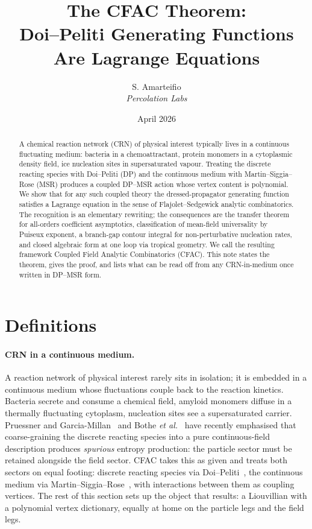 \documentclass[11pt,a4paper]{article}
\title{The CFAC Theorem:\\[4pt]
  \large Doi--Peliti Generating Functions Are Lagrange Equations}
\author{S. Amarteifio\\
  \small\textit{Percolation Labs}}
\date{April 2026}
\theoremstyle{plain}
\theoremstyle{definition}
\begin{document}
\maketitle

\begin{abstract}
A chemical reaction network (CRN) of physical interest typically
lives in a continuous fluctuating medium: bacteria in a
chemoattractant, protein monomers in a cytoplasmic density field,
ice nucleation sites in supersaturated vapour.  Treating the
discrete reacting species with Doi--Peliti (DP) and the
continuous medium with Martin--Siggia--Rose (MSR) produces a
coupled DP--MSR action whose vertex content is polynomial.  We
show that for any such coupled theory the dressed-propagator
generating function satisfies a Lagrange equation in the sense of
Flajolet--Sedgewick analytic combinatorics.  The recognition is
an elementary rewriting; the consequences are the transfer
theorem for all-orders coefficient asymptotics, classification of
mean-field universality by Puiseux exponent, a branch-gap contour
integral for non-perturbative nucleation rates, and closed
algebraic form at one loop via tropical geometry.  We call the
resulting framework Coupled Field Analytic Combinatorics (CFAC).
This note states the theorem, gives the proof, and lists what can
be read off from any CRN-in-medium once written in DP--MSR form.
\end{abstract}

\section{Definitions}
\label{sec:defs}

\paragraph{CRN in a continuous medium.}
A reaction network of physical interest rarely sits in isolation;
it is embedded in a continuous medium whose fluctuations couple
back to the reaction kinetics.  Bacteria secrete and consume a
chemical field, amyloid monomers diffuse in a thermally
fluctuating cytoplasm, nucleation sites see a supersaturated
carrier.  Pruessner and
Garcia-Millan~\citep{PruessnerGarciaMillan2025} and Bothe
\textit{et al.}~\citep{Bothe2023} have recently emphasised that
coarse-graining the discrete reacting species into a pure
continuous-field description produces \emph{spurious} entropy
production: the particle sector must be retained alongside the
field sector.  CFAC takes this as given and treats both sectors
on equal footing: discrete reacting species via
Doi--Peliti~\citep{Doi1976,Peliti1985,Tauber}, the continuous
medium via Martin--Siggia--Rose~\citep{MSR1973,Janssen1976,DeDominicis1976},
with interactions between them as coupling vertices.  The rest
of this section sets up the object that results: a Liouvillian
with a polynomial vertex dictionary, equally at home on the
particle legs and the field legs.
\end{document}
